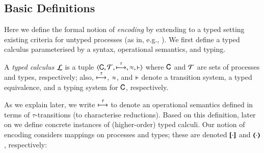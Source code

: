 
\subsection{Basic Definitions}
Here we define the formal notion of \emph{encoding} by 
extending to a typed setting existing criteria for untyped processes (as in, e.g.,
\cite{Nestmann00,Palamidessi03,DBLP:conf/lics/PalamidessiSVV06,DBLP:journals/iandc/Gorla10,DBLP:conf/icalp/LanesePSS10,DBLP:journals/tcs/FuL10,DBLP:journals/corr/abs-1208-2750,DBLP:conf/esop/PetersNG13}). 
We first define a typed calculus parameterised by a syntax, operational semantics, and typing.

\smallskip 

\begin{definition}\label{d:tcalculus}%
	A \emph{typed calculus} $\mathcal{L}$ is a tuple
	$\langle \mathsf{C}, \cal{T}, \stackrel{\tau}{\longmapsto}, \approx, \vdash \rangle$
	where $\mathsf{C}$ and $\cal{T}$ are sets of processes and types, 
	respectively; also, $\stackrel{\tau}{\longmapsto}$, $\approx$, and $\vdash$ 
	denote a transition system, a typed equivalence,
	and a typing system for $\mathsf{C}$, respectively. 
\end{definition}

%
%
%
%

\smallskip 

\noi 
As we explain later, we write $\stackrel{\tau}{\longmapsto}$ to denote an operational semantics defined in terms of
$\tau$-transitions (to characterise reductions).
Based on this definition, later on we define concrete instances of (higher-order) typed calculi.
Our notion of encoding considers mappings on processes 
and types; these are denoted $[\!\![\cdot]\!\!]$ and $(\!\!\langle\cdot\rangle\!\!)$, respectively: %


